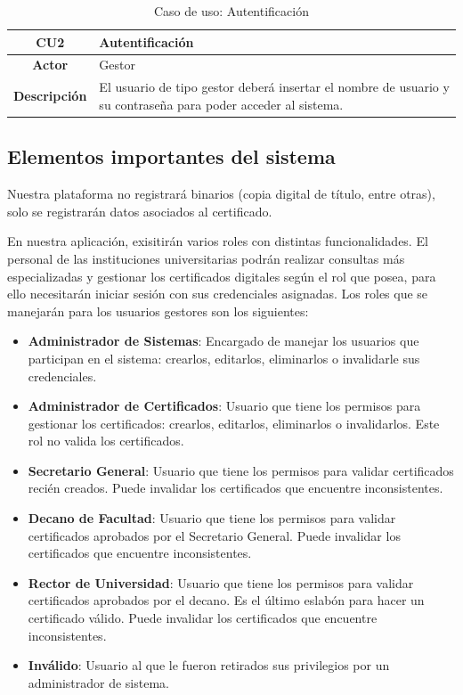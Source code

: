 \begin{table}[!h]
	\begin{center}
		\begin{tabular}{|c|p{10cm}|}
		\hline \textbf{CU2} & Autentificación \\ 
		\hline \textbf{Actor} & Gestor\\ 
		\hline \textbf{Descripción} & El usuario de tipo gestor deberá insertar el nombre de usuario y su contraseña para poder acceder al sistema.\\ 
		\hline 
		\end{tabular}
		\caption{Caso de uso: Autentificación}
		\label{tab:CU2}
	\end{center}
\end{table}

\subsection{Elementos importantes del sistema}
Nuestra plataforma no registrará binarios (copia digital de título, entre otras), solo se registrarán datos asociados al certificado.

En nuestra aplicación, exisitirán varios roles con distintas funcionalidades. El personal de las instituciones universitarias podrán realizar consultas más especializadas y gestionar los certificados digitales según el rol que posea, para ello necesitarán iniciar sesión con sus credenciales asignadas. Los roles que se manejarán para los usuarios gestores son los siguientes:

\begin{itemize}
\item \textbf{Administrador de Sistemas}: Encargado de manejar los usuarios que participan en el sistema: crearlos, editarlos, eliminarlos o invalidarle sus credenciales.
\item \textbf{Administrador de Certificados}: Usuario que tiene los permisos para gestionar los certificados: crearlos, editarlos, eliminarlos o invalidarlos. Este rol no valida los certificados.
\item \textbf{Secretario General}: Usuario que tiene los permisos para validar certificados recién creados. Puede invalidar los certificados que encuentre inconsistentes.
\item \textbf{Decano de Facultad}: Usuario que tiene los permisos para validar certificados aprobados por el Secretario General. Puede invalidar los certificados que encuentre inconsistentes.
\item \textbf{Rector de Universidad}: Usuario que tiene los permisos para validar certificados aprobados por el decano. Es el último eslabón para hacer un certificado válido. Puede invalidar los certificados que encuentre inconsistentes.
\item \textbf{Inválido}: Usuario al que le fueron retirados sus privilegios por un administrador de sistema.
\end{itemize}

